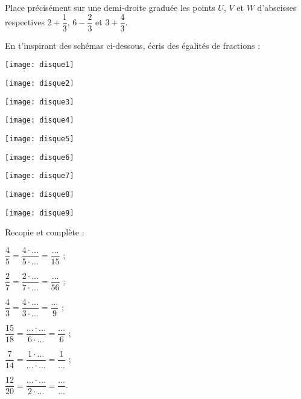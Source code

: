 \begin{exercice}
Place précisément sur une demi‑droite graduée les points $U$, $V$ et $W$ d'abscisses respectives $2 + \dfrac{1}{3}$, $6 - \dfrac{2}{3}$ et $3 + \dfrac{4}{3}$.
\end{exercice}



\begin{exercice}
En t'inspirant des schémas ci-dessous, écris des égalités de fractions :
\begin{colenumerate}{3}
 \item
 
 \texttt{[image: disque1]}
 \item
 
 \texttt{[image: disque2]}
 \item
 
 \texttt{[image: disque3]}
 \item
 
 \texttt{[image: disque4]}
 \item
 
 \texttt{[image: disque5]}
 \item
 
 \texttt{[image: disque6]}
 \item
 
 \texttt{[image: disque7]}
 \item
 
 \texttt{[image: disque8]}
 \item
 
 \texttt{[image: disque9]}
 \end{colenumerate}
\end{exercice}


\begin{exercice}
Recopie et complète :
\begin{colenumerate}{2}
 \item $\dfrac{4}{5} = \dfrac{4 \cdot \ldots}{5 \cdot \ldots} = \dfrac{\ldots}{15}$ ;
 \vspace{0.3cm}
 \item $\dfrac{2}{7} = \dfrac{2 \cdot \ldots}{7 \cdot \ldots} = \dfrac{\ldots}{56}$ ;
 \vspace{0.3cm}
 \item $\dfrac{4}{3} = \dfrac{4 \cdot \ldots}{3 \cdot \ldots} = \dfrac{\ldots}{9}$ ;
 \item $\dfrac{15}{18} = \dfrac{\ldots \cdot \ldots}{6 \cdot \ldots} = \dfrac{\ldots}{6}$ ;
 \item $\dfrac{7}{14} = \dfrac{1 \cdot \ldots}{\ldots \cdot \ldots} = \dfrac{1}{\ldots}$ ;
 \item $\dfrac{12}{20} = \dfrac{\ldots \cdot \ldots}{2 \cdot \ldots} = \dfrac{\ldots}{\ldots}$.
 \end{colenumerate}
\end{exercice}


